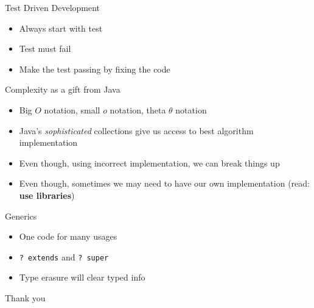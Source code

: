 \documentclass{beamer}
\begin{document}
\begin{frame}{Test Driven Development}

    \begin{itemize}
        \item Always start with test \pause
        \item Test must fail \pause
        \item Make the test passing by fixing the code \pause
    \end{itemize}
\end{frame}

\begin{frame}{Complexity as a gift from Java}

    \begin{itemize}
        \item Big $O$ notation, small $o$ notation, theta $\theta$ notation \pause
        \item Java's \textit{sophisticated} collections give us access to best algorithm implementation \pause
        \item Even though, using incorrect implementation, we can break things up \pause
        \item Even though, sometimes we may need to have our own implementation (read: \textbf{use libraries})
    \end{itemize}
\end{frame}

\begin{frame}{Generics}

    \begin{itemize}
        \item One code for many usages
        \item \texttt{? extends} and \texttt{? super}
        \item Type erasure will clear typed info
    \end{itemize}
\end{frame}

\begin{frame}[c]{ }
    \centering
    Thank you
\end{frame}
\end{document}
